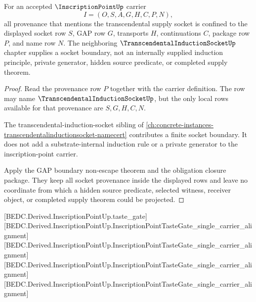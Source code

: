 \begin{theorem}
\label{thm:inscription-point-transcendental-socket-provenance-nonescape}
For an accepted $\InscriptionPointUp$ carrier
$$
I=(O,S,A,G,H,C,P,N),
$$
all provenance that mentions the transcendental supply socket is confined to the displayed socket row $S$, GAP row $G$, transports $H$, continuations $C$, package row $P$, and name row $N$. The neighboring $\TranscendentalInductionSocketUp$ chapter supplies a socket boundary, not an internally supplied induction principle, private generator, hidden source predicate, or completed supply theorem.
\end{theorem}
\begin{proof}
Read the provenance row $P$ together with the carrier definition. The row may name $\TranscendentalInductionSocketUp$, but the only local rows available for that provenance are $S,G,H,C,N$.

The transcendental-induction-socket sibling of \autoref{ch:concrete-instances-transcendentalinductionsocket-namecert} contributes a finite socket boundary. It does not add a substrate-internal induction rule or a private generator to the inscription-point carrier.

Apply the GAP boundary non-escape theorem and the obligation closure package. They keep all socket provenance inside the displayed rows and leave no coordinate from which a hidden source predicate, selected witness, receiver object, or completed supply theorem could be projected.
\end{proof}

[BEDC.Derived.InscriptionPointUp.taste\_gate]
[BEDC.Derived.InscriptionPointUp.InscriptionPointTasteGate\_single\_carrier\_alignment]
[BEDC.Derived.InscriptionPointUp.InscriptionPointTasteGate\_single\_carrier\_alignment]
[BEDC.Derived.InscriptionPointUp.InscriptionPointTasteGate\_single\_carrier\_alignment]
[BEDC.Derived.InscriptionPointUp.InscriptionPointTasteGate\_single\_carrier\_alignment]

